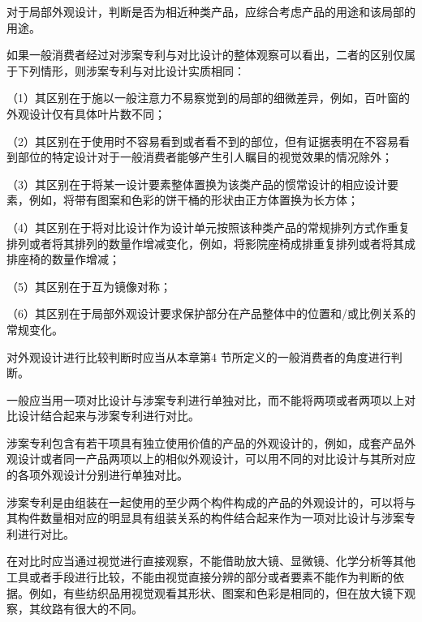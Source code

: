 对于局部外观设计，判断是否为相近种类产品，应综合考虑产品的用途和该局部的用途。

如果一般消费者经过对涉案专利与对比设计的整体观察可以看出，二者的区别仅属于下列情形，则涉案专利与对比设计实质相同：

{\setlength{\parindent}{17.1bp}（1）其区别在于施以一般注意力不易察觉到的局部的细微差异，例如，百叶窗的外观设计仅有具体叶片数不同；\par}

{\setlength{\parindent}{17.1bp}（2）其区别在于使用时不容易看到或者看不到的部位，但有证据表明在不容易看到部位的特定设计对于一般消费者能够产生引人瞩目的视觉效果的情况除外；\par}

{\setlength{\parindent}{17.1bp}（3）其区别在于将某一设计要素整体置换为该类产品的惯常设计的相应设计要素，例如，将带有图案和色彩的饼干桶的形状由正方体置换为长方体；\par}

{\setlength{\parindent}{17.1bp}（4）其区别在于将对比设计作为设计单元按照该种类产品的常规排列方式作重复排列或者将其排列的数量作增减变化，例如，将影院座椅成排重复排列或者将其成排座椅的数量作增减；\par}

{\setlength{\parindent}{17.1bp}（5）其区别在于互为镜像对称；\par}

{\setlength{\parindent}{17.1bp}（6）其区别在于局部外观设计要求保护部分在产品整体中的位置和/或比例关系的常规变化。\par}

对外观设计进行比较判断时应当从本章第4 节所定义的一般消费者的角度进行判断。

一般应当用一项对比设计与涉案专利进行单独对比，而不能将两项或者两项以上对比设计结合起来与涉案专利进行对比。

涉案专利包含有若干项具有独立使用价值的产品的外观设计的，例如，成套产品外观设计或者同一产品两项以上的相似外观设计，可以用不同的对比设计与其所对应的各项外观设计分别进行单独对比。

涉案专利是由组装在一起使用的至少两个构件构成的产品的外观设计的，可以将与其构件数量相对应的明显具有组装关系的构件结合起来作为一项对比设计与涉案专利进行对比。

在对比时应当通过视觉进行直接观察，不能借助放大镜、显微镜、化学分析等其他工具或者手段进行比较，不能由视觉直接分辨的部分或者要素不能作为判断的依据。例如，有些纺织品用视觉观看其形状、图案和色彩是相同的，但在放大镜下观察，其纹路有很大的不同。

